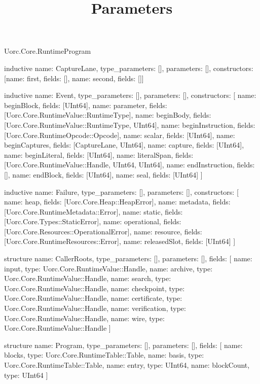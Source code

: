 \begin{lexlean}{Uorc.Core.RuntimeProgram}
\title{Parameters}
\begin{semanticmodule}
inductive{
  name: CaptureLane,
  type_parameters: [],
  parameters: [],
  constructors: [{name: first, fields: []}, {name: second, fields: []}]
}

inductive{
  name: Event,
  type_parameters: [],
  parameters: [],
  constructors: [
    {name: beginBlock, fields: [UInt64]},
    {name: parameter, fields: [Uorc.Core.RuntimeValue::RuntimeType]},
    {name: beginBody, fields: [Uorc.Core.RuntimeValue::RuntimeType, UInt64]},
    {name: beginInstruction, fields: [Uorc.Core.RuntimeOpcode::Opcode]},
    {name: scalar, fields: [UInt64]},
    {name: beginCaptures, fields: [CaptureLane, UInt64]},
    {name: capture, fields: [UInt64]},
    {name: beginLiteral, fields: [UInt64]},
    {name: literalSpan, fields: [Uorc.Core.RuntimeValue::Handle, UInt64, UInt64]},
    {name: endInstruction, fields: []},
    {name: endBlock, fields: [UInt64]},
    {name: seal, fields: [UInt64]}
  ]
}

inductive{
  name: Failure,
  type_parameters: [],
  parameters: [],
  constructors: [
    {name: heap, fields: [Uorc.Core.Heap::HeapError]},
    {name: metadata, fields: [Uorc.Core.RuntimeMetadata::Error]},
    {name: static, fields: [Uorc.Core.Types::StaticError]},
    {name: operational, fields: [Uorc.Core.Resources::OperationalError]},
    {name: resource, fields: [Uorc.Core.RuntimeResources::Error]},
    {name: releasedSlot, fields: [UInt64]}
  ]
}

structure{
  name: CallerRoots,
  type_parameters: [],
  parameters: [],
  fields: [
    {name: input, type: Uorc.Core.RuntimeValue::Handle},
    {name: archive, type: Uorc.Core.RuntimeValue::Handle},
    {name: search, type: Uorc.Core.RuntimeValue::Handle},
    {name: checkpoint, type: Uorc.Core.RuntimeValue::Handle},
    {name: certificate, type: Uorc.Core.RuntimeValue::Handle},
    {name: verification, type: Uorc.Core.RuntimeValue::Handle},
    {name: wire, type: Uorc.Core.RuntimeValue::Handle}
  ]
}

structure{
  name: Program,
  type_parameters: [],
  parameters: [],
  fields: [
    {name: blocks, type: Uorc.Core.RuntimeTable::Table},
    {name: basis, type: Uorc.Core.RuntimeTable::Table},
    {name: entry, type: UInt64},
    {name: blockCount, type: UInt64}
  ]
}


\end{semanticmodule}
\end{lexlean}
